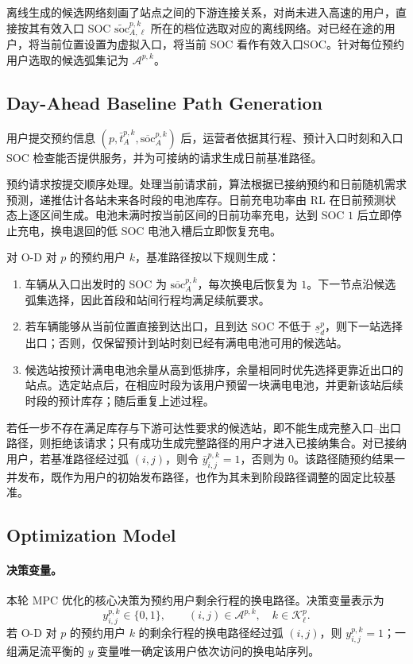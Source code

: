 \documentclass[12pt,a4paper,UTF8]{ctexart}
\begin{document}
离线生成的候选网络刻画了站点之间的下游连接关系，对尚未进入高速的用户，直接按其有效入口 SOC $\widetilde{\mathrm{soc}}_{A,\ell}^{p,k}$ 所在的档位选取对应的离线网络。对已经在途的用户，将当前位置设置为虚拟入口，将当前 SOC 看作有效入口SOC。针对每位预约用户选取的候选弧集记为 $\mathcal A^{p,k}$。


\subsection{Day-Ahead Baseline Path Generation}

用户提交预约信息
$\left(p,\bar t_A^{p,k},\overline{\mathrm{soc}}_A^{p,k}\right)$
后，运营者依据其行程、预计入口时刻和入口 SOC 检查能否提供服务，并为可接纳的请求生成日前基准路径。

预约请求按提交顺序处理。处理当前请求前，算法根据已接纳预约和日前随机需求预测，递推估计各站未来各时段的电池库存。日前充电功率由 RL 在日前预测状态上逐区间生成。电池未满时按当前区间的日前功率充电，达到 SOC $1$ 后立即停止充电，换电退回的低 SOC 电池入槽后立即恢复充电。

对 O-D 对 $p$ 的预约用户 $k$，基准路径按以下规则生成：
\begin{enumerate}
  \item 车辆从入口出发时的 SOC 为 $\overline{\mathrm{soc}}_A^{p,k}$，每次换电后恢复为 $1$。下一节点沿候选弧集选择，因此首段和站间行程均满足续航要求。
  \item 若车辆能够从当前位置直接到达出口，且到达 SOC 不低于 $\underline s_d^p$，则下一站选择出口；否则，仅保留预计到站时刻已经有满电电池可用的候选站。
  \item 候选站按预计满电电池余量从高到低排序，余量相同时优先选择更靠近出口的站点。选定站点后，在相应时段为该用户预留一块满电电池，并更新该站后续时段的预计库存；随后重复上述过程。
\end{enumerate}

若任一步不存在满足库存与下游可达性要求的候选站，即不能生成完整入口--出口路径，则拒绝该请求；只有成功生成完整路径的用户才进入已接纳集合。对已接纳用户，若基准路径经过弧 $(i,j)$，则令 $\bar y_{i,j}^{p,k}=1$，否则为 $0$。该路径随预约结果一并发布，既作为用户的初始发布路径，也作为其未到阶段路径调整的固定比较基准。


\subsection{Optimization Model}


\paragraph{决策变量。}
本轮 MPC 优化的核心决策为预约用户剩余行程的换电路径。决策变量表示为
\[
y_{i,j}^{p,k}\in\{0,1\},
\qquad
(i,j)\in\mathcal A^{p,k},
\quad
k\in\mathcal K_\ell^p.
\]
若 O-D 对 $p$ 的预约用户 $k$ 的剩余行程的换电路径经过弧 $(i,j)$，则 $y_{i,j}^{p,k}=1$；一组满足流平衡的 $y$ 变量唯一确定该用户依次访问的换电站序列。
\end{document}
